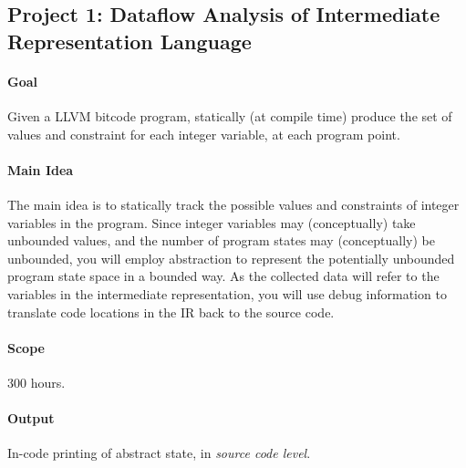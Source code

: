 \documentclass[english]{article}
\begin{document}
\subsection*{Project 1: Dataflow Analysis of Intermediate Representation Language}
\paragraph{Goal} Given a LLVM bitcode program, statically (at compile time) produce the set of values and constraint for each integer variable, at each program point.
\paragraph{Main Idea} The main idea is to statically track the possible values and constraints of integer variables in the program. Since integer variables may (conceptually) take unbounded values, and the number of program states may (conceptually) be unbounded, you will employ abstraction to represent the potentially unbounded program state space in a bounded way. As the collected data will refer to the variables in the intermediate representation, you will use debug information to translate code locations in the IR back to the source code.
\paragraph{Scope} 300 hours.
\paragraph{Output} In-code printing of abstract state, in \emph{source code level}.
\end{document}
